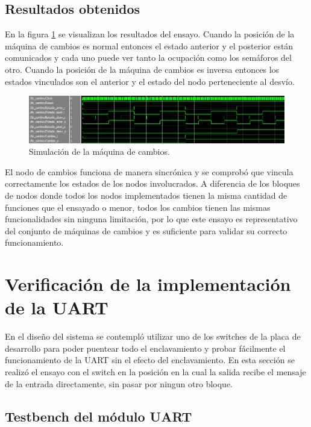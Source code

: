 	\subsection{Resultados obtenidos}
			
		En la figura \ref{fig:Test_Cambios} se visualizan los resultados del ensayo. Cuando la posición de la máquina de cambios es normal entonces el estado anterior y el posterior están comunicados y cada uno puede ver tanto la ocupación como los semáforos del otro. Cuando la posición de la máquina de cambios es inversa entonces los estados vinculados son el anterior y el estado del nodo perteneciente al desvío.
		
		\begin{figure}[h]
		\centering
		\includegraphics[scale=0.55]{./Figures/Test/Cambio}
			\caption{Simulación de la máquina de cambios.}
			\label{fig:Test_Cambios}
		\end{figure}
			
		\vspace{5cm}
			
		El nodo de cambios funciona de manera sincrónica y se comprobó que vincula correctamente los estados de los nodos involucrados. A diferencia de los bloques de nodos donde todos los nodos implementados tienen la misma cantidad de funciones que el ensayado o menor, todos los cambios tienen las mismas funcionalidades sin ninguna limitación, por lo que este ensayo es representativo del conjunto de máquinas de cambios y es suficiente para validar su correcto funcionamiento.
				
\section{Verificación de la implementación de la UART}

	En el diseño del sistema se contempló utilizar uno de los switches de la placa de desarrollo para poder puentear todo el enclavamiento y probar fácilmente el funcionamiento de la UART sin el efecto del enclavamiento. En esta sección se realizó el ensayo con el switch en la posición en la cual la salida recibe el mensaje de la entrada directamente, sin pasar por ningun otro bloque.

	\subsection{Testbench del módulo UART}
			
